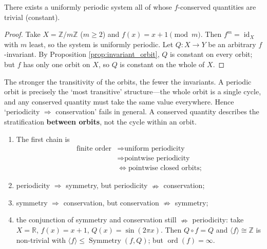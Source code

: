 \begin{theorem}\label{thm:period_not_imply_conservation}
There exists a uniformly periodic system all of whose $f$-conserved quantities are trivial (constant).
\end{theorem}

\begin{proof}
Take $X=\mathbb{Z}/m\mathbb{Z}$ ($m\ge 2$) and $f(x)=x+1\pmod m$. Then $f^m=\operatorname{id}_X$ with $m$ least, so the system is uniformly periodic. Let $Q:X\to Y$ be an arbitrary $f$-invariant. By Proposition \ref{prop:invariant_orbit}, $Q$ is constant on every orbit; but $f$ has only one orbit on $X$, so $Q$ is constant on the whole of $X$.
\end{proof}

\begin{remark}\label{rem:gap_diagnosis}
The stronger the transitivity of the orbits, the fewer the invariants. A periodic orbit is precisely the `most transitive' structure---the whole orbit is a single cycle, and any conserved quantity must take the same value everywhere. Hence `periodicity $\Rightarrow$ conservation' fails in general. A conserved quantity describes the stratification \textbf{between orbits}, not the cycle within an orbit.
\end{remark}

\begin{corollary}\label{cor:true_logic}
\begin{enumerate}[label=(\roman*)]
    \item The first chain is
    \[
    \begin{aligned}
    \text{finite order}&\Rightarrow\text{uniform periodicity}\\
    &\Rightarrow\text{pointwise periodicity}\\
    &\iff\text{pointwise closed orbits};
    \end{aligned}
    \]
    \item periodicity $\Rightarrow$ symmetry, but periodicity $\nRightarrow$ conservation;
    \item symmetry $\Rightarrow$ conservation, but conservation $\nRightarrow$ symmetry;
    \item the conjunction of symmetry and conservation still $\nRightarrow$ periodicity: take $X=\mathbb{R}$, $f(x)=x+1$, $Q(x)=\sin(2\pi x)$. Then $Q\circ f=Q$ and $\langle f\rangle\cong\mathbb{Z}$ is non-trivial with $\langle f\rangle\le\operatorname{Symmetry}(f,Q)$; but $\operatorname{ord}(f)=\infty$.
\end{enumerate}
\end{corollary}

